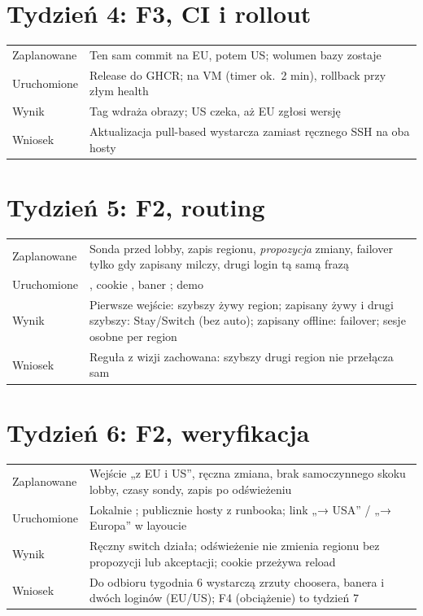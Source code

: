 \section{Tydzień 4: F3, CI i rollout}
\begin{tabularx}{\textwidth}{@{}p{}Y@{}}
\toprule
Zaplanowane & Ten sam commit na EU, potem US; wolumen bazy zostaje \\
Uruchomione & Release do GHCR; na VM  (timer ok.\ 2 min), rollback przy złym health \\
Wynik & Tag  wdraża obrazy; US czeka, aż EU zgłosi wersję \\
Wniosek & Aktualizacja pull-based wystarcza zamiast ręcznego SSH na oba hosty \\
\bottomrule
\end{tabularx}

\section{Tydzień 5: F2, routing}
\begin{tabularx}{\textwidth}{@{}p{}Y@{}}
\toprule
Zaplanowane & Sonda przed lobby, zapis regionu, \emph{propozycja} zmiany, failover tylko gdy zapisany milczy, drugi login tą samą frazą \\
Uruchomione & , cookie , baner ; demo  \\
Wynik & Pierwsze wejście: szybszy żywy region; zapisany żywy i drugi szybszy: Stay/Switch (bez auto); zapisany offline: failover; sesje osobne per region \\
Wniosek & Reguła z wizji zachowana: szybszy drugi region nie przełącza sam \\
\bottomrule
\end{tabularx}

\section{Tydzień 6: F2, weryfikacja}
\begin{tabularx}{\textwidth}{@{}p{}Y@{}}
\toprule
Zaplanowane & Wejście „z EU i US'', ręczna zmiana, brak samoczynnego skoku lobby, czasy sondy, zapis po odświeżeniu \\
Uruchomione & Lokalnie ; publicznie hosty z runbooka; link „→ USA'' / „→ Europa'' w layoucie \\
Wynik & Ręczny switch działa; odświeżenie nie zmienia regionu bez propozycji lub akceptacji; cookie przeżywa reload \\
Wniosek & Do odbioru tygodnia 6 wystarczą zrzuty choosera, banera i dwóch loginów (EU/US); F4 (obciążenie) to tydzień 7 \\
\bottomrule
\end{tabularx}

